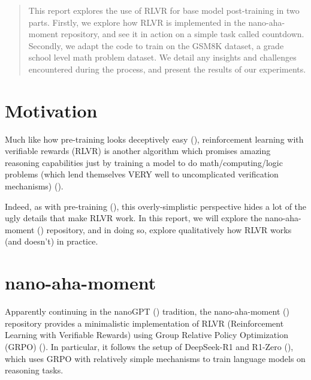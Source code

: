 \documentclass{article} %
\theoremstyle{definition}
\begin{document}
\begin{abstract}
    This report explores the use of RLVR for base model post-training in two parts.
    Firstly, we explore how RLVR is implemented in the nano-aha-moment repository, and see it in action
    on a simple task called countdown.
    Secondly, we adapt the code to train on the GSM8K dataset, a grade school level math problem dataset.
    We detail any insights and challenges encountered during the process,
    and present the results of our experiments.
\end{abstract}

\section{Motivation}

Much like how pre-training looks deceptively easy (\cite{beh-2025-b}),
reinforcement learning with verifiable rewards (RLVR) is another algorithm
which promises amazing reasoning capabilities just by training a model to do 
math/computing/logic problems (which lend themselves VERY well to uncomplicated verification mechanisms) 
(\cite{grpo, r1, tulu3}).

Indeed, as with pre-training (\cite{beh-2025-b}), this overly-simplistic perspective hides 
a lot of the ugly details that make RLVR work.
In this report, we will explore the nano-aha-moment (\cite{nano-aha-moment}) repository,
and in doing so, explore qualitatively how RLVR works (and doesn't) in practice.

\section{nano-aha-moment}
Apparently continuing in the nanoGPT (\cite{nanoGPT}) tradition,
the nano-aha-moment (\cite{nano-aha-moment}) repository provides a minimalistic implementation 
of RLVR (Reinforcement Learning with Verifiable Rewards) using Group Relative Policy Optimization (GRPO) (\cite{grpo}).
In particular, it follows the setup of DeepSeek-R1 and R1-Zero (\cite{r1}),
which uses GRPO with relatively simple mechanisms to train language models on reasoning tasks.
\end{document}
